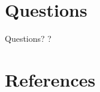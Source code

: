 \documentclass[11pt]{beamer}
\begin{document}
	\section{Questions}
		\begin{frame}{Questions?}
			\large ?
		\end{frame}

	\section*{References}
		\begin{frame}{References}
			\texttt{\}
		\end{frame}
\end{document}
